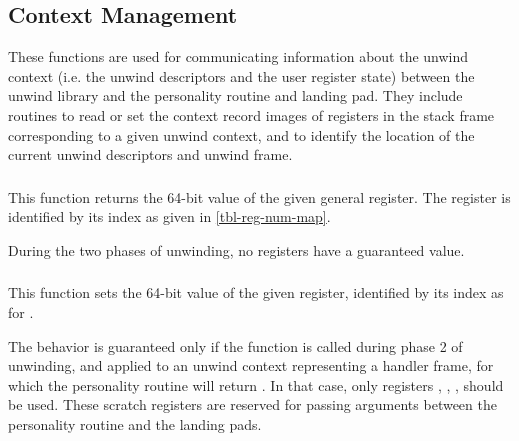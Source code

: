 \subsection{Context Management}

These functions are used for communicating information about the unwind
context (i.e. the unwind descriptors and the user register state) between
the unwind library and the personality routine and landing pad. They
include routines to read or set the context record images of registers in
the stack frame corresponding to a given unwind context, and to identify
the location of the current unwind descriptors and unwind frame.

\subsubsection{}


This function returns the 64-bit value of the given general register.
The register is identified by its index as given in \ref{tbl-reg-num-map}.

During the two phases of unwinding, no registers have a guaranteed value.

\subsubsection{}


This function sets the 64-bit value of the given register, identified by
its index as for .

The behavior is guaranteed only if the function is called during phase 2
of unwinding, and applied to an unwind context representing a handler frame,
for which the personality routine will return .
In that case, only registers \RDI, \RSI, \RDX, \RCX should be used.
These scratch registers are reserved for passing arguments between the
personality routine and the landing pads.

